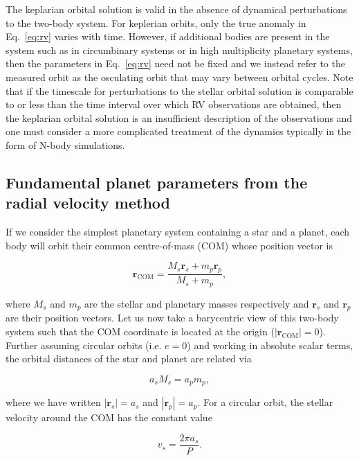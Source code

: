 The keplarian orbital solution is valid in the absence of dynamical 
perturbations to the two-body system. For keplerian orbits, only the true anomaly in
Eq.~\ref{eq:rv} varies with time. However,
if additional bodies are present in the system such as in circumbinary  
systems or in high multiplicity planetary systems, then the parameters in 
Eq.~\ref{eq:rv} need not be fixed and we instead refer to the measured orbit as the 
osculating orbit that may vary between orbital cycles. Note that if the timescale 
for perturbations to the stellar orbital solution is comparable to or less than the 
time interval over which RV observations are obtained, then the keplarian 
orbital solution is an insufficient description of the observations and one must consider
a more complicated treatment of the dynamics typically in the form of N-body simulations.


\subsection{Fundamental planet parameters from the radial velocity method} \label{sect:K}
If we consider the simplest planetary system containing a star and a planet, each body will 
orbit their common centre-of-mass (COM) whose position vector is

\begin{equation}
\mathbf{r}_{\mathrm{COM}} = \frac{M_s \mathbf{r}_s + m_p \mathbf{r}_p}{M_s + m_p},
\end{equation}

\noindent where $M_s$ and $m_p$ are the stellar and planetary masses respectively and
$\mathbf{r}_s$ and $\mathbf{r}_p$ are their position vectors. 
Let us now take a barycentric view of this two-body system such that the 
COM coordinate is located at the origin ($|\mathbf{r}_{\mathrm{COM}}|=0$). Further
assuming circular orbits (i.e. $e=0$) and working 
in absolute scalar terms, the orbital distances of the star and planet are  
related via 

\begin{equation}
a_s M_s = a_p m_p,
\label{eq:com}
\end{equation}
  
\noindent where we have written $|\mathbf{r}_s|=a_s$ and 
$|\mathbf{r}_p|=a_p$. For a circular orbit, the stellar velocity around the COM has
the constant value

\begin{equation}
v_s = \frac{2\pi a_s}{P}.
\label{eq:velocity}
\end{equation}

